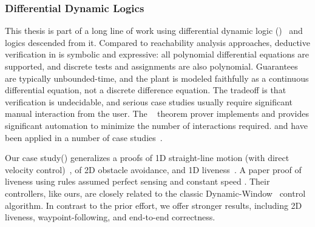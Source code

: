\documentclass[12pt]{cmuthesis}
\theoremstyle{definition}
\theoremstyle{remark}
\newcommand{\rref}[2][]{\prettyref{#2}}
\begin{document}
\subsubsection{Differential Dynamic Logics}
This thesis is part of a long line of work using differential dynamic logic (\dL)~\cite{DBLP:journals/jar/Platzer08,DBLP:conf/lics/Platzer12a,DBLP:journals/jar/Platzer17} and logics descended from it.
Compared to reachability analysis approaches, deductive verification in \dL is symbolic and expressive: all polynomial differential equations are supported, and discrete tests and assignments are also polynomial.
Guarantees are typically unbounded-time, and the plant is modeled faithfully as a continuous differential equation, not a discrete difference equation.
The tradeoff is that verification is undecidable, and serious case studies usually require significant manual interaction from the user.
The \KeYmaeraX~\cite{DBLP:conf/cade/FultonMQVP15} theorem prover implements \dL and provides significant automation to minimize the number of interactions required.
\dL and \KeYmaeraX have been applied in a number of case studies~\cite{DBLP:conf/cade/Platzer16}.

Our case study(\rref{sec:ground-robotics}) generalizes a \dL proofs of  1D straight-line motion (with direct velocity control)~\cite{DBLP:conf/pldi/BohrerTMMP18}, of 2D obstacle avoidance, and 1D liveness~\cite{DBLP:conf/rss/MitschGP13,DBLP:journals/ijrr/MitschGVP17}.
A paper proof of liveness using \dL rules assumed perfect sensing and constant speed \cite{DBLP:journals/corr/abs-1709-02561}.
Their controllers, like ours, are closely related to the classic Dynamic-Window~\cite{DBLP:journals/ram/FoxBT97} control algorithm.
In contrast to the prior \dL effort, we offer stronger results, including 2D liveness, waypoint-following, and end-to-end correctness.
\end{document}
